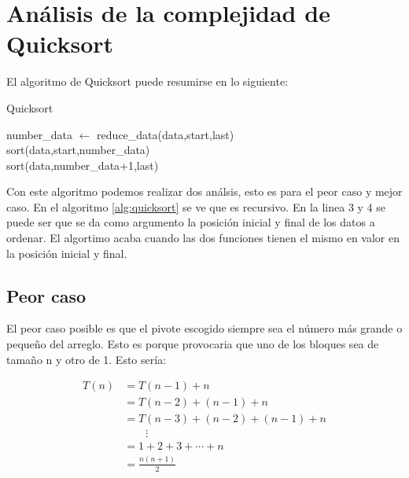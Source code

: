 \section{Análisis de la complejidad de Quicksort}

El algoritmo de Quicksort puede resumirse en lo siguiente:

\begin{algorithm}[H]
    \caption{Quicksort}
    \label{alg:quicksort}
    {
        number\_data $\gets$ reduce\_data(data,start,last)\\
        sort(data,start,number\_data)\\
        sort(data,number\_data+1,last)\\

    }
\end{algorithm}

Con este algoritmo podemos realizar dos análsis, esto es para el peor caso y mejor caso. En el algoritmo \ref{alg:quicksort} se ve que es recursivo. En la linea 3 y 4 se puede ser que se da como argumento la posición inicial y final de los datos a ordenar. El algortimo acaba cuando las dos funciones tienen el mismo en valor en la posición inicial y final.

\subsection{Peor caso}

El peor caso posible es que el pivote escogido siempre sea el número más grande o pequeño del arreglo. Esto es porque provocaria que uno de los bloques sea de tamaño n y otro de 1. Esto sería:

\begin{align*}
    T(n) & = T(n-1) + n              \\
         & = T(n-2)+ (n-1) + n       \\
         & = T(n-3)+(n-2)+ (n-1) + n \\
         & \qquad \vdots             \\
         & =1 +2 +3 + \cdots +n      \\
         & =\frac{n(n+1)}{2}
\end{align*}

